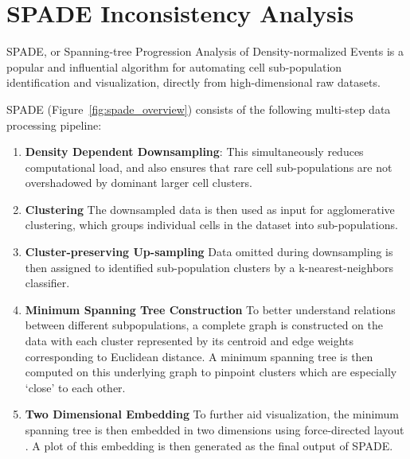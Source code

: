 \documentclass{article}
\begin{document}
\section{SPADE Inconsistency Analysis}
\label{sec:spade}
SPADE, or Spanning-tree Progression Analysis of Density-normalized Events \cite{} is a popular and influential algorithm for automating cell sub-population identification and visualization, directly from high-dimensional raw datasets.

 SPADE  (Figure~\ref{fig:spade_overview}) consists of the following multi-step data processing pipeline:

\begin{enumerate}
\item \textbf{Density Dependent Downsampling}: This simultaneously reduces computational load, and also ensures that rare cell sub-populations are not overshadowed by dominant larger cell clusters. 

\item \textbf{Clustering} The downsampled data is then used as input for agglomerative clustering, which groups individual cells in the dataset into sub-populations. 

\item \textbf{Cluster-preserving Up-sampling} Data omitted during downsampling is then assigned to identified sub-population clusters by a k-nearest-neighbors classifier.

\item \textbf{Minimum Spanning Tree Construction} To better understand relations between different subpopulations, a complete graph is constructed on the data with each cluster represented by its centroid and edge weights corresponding to Euclidean distance.  
A minimum spanning tree is then computed on this underlying graph to pinpoint clusters which are especially ‘close’ to each other.
 
\item \textbf{Two Dimensional Embedding} To further aid visualization, the minimum spanning tree is then embedded in two dimensions using force-directed layout \cite{}. 
A plot of this embedding is then generated as the final output of SPADE.
\end{enumerate}
\end{document}
